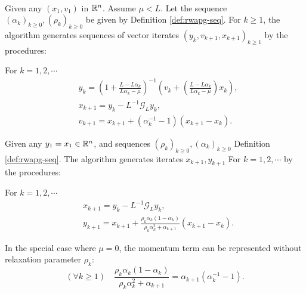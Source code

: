 \documentclass[12pt]{article}
\begin{document}
        \begin{definition}\label{def:r-wapg-st-form} \; \\
            Given any $(x_1, v_1)$ in $\mathbb R^n$. 
            Assume $\mu < L$.
            Let the sequence $(\alpha_k)_{k \ge 0}, (\rho_k)_{k\ge 0}$ be given by Definition \ref{def:rwapg-seq}. 
            For $k \ge 1$, the algorithm generates sequences of vector iterates $(y_k, v_{k + 1}, x_{k + 1})_{k \ge 1}$ by the procedures: 
            \begin{tcolorbox}
                For $k=1, 2, \cdots $
                \begin{align*}
                    & y_k = 
                    \left(
                        1 + \frac{L - L\alpha_k}{L\alpha_k - \mu}
                    \right)^{-1}
                    \left(
                        v_k + 
                        \left(\frac{L - L\alpha_k}{L\alpha_k - \mu} \right) x_k
                    \right), 
                    \\
                    & x_{k + 1} = 
                    y_k - L^{-1} \mathcal G_L y_k, 
                    \\
                    & v_{k + 1} = 
                    x_{k + 1} + (\alpha_k^{-1} -1)(x_{k + 1} - x_k). 
                \end{align*}    
            \end{tcolorbox}
        \end{definition}
        \begin{definition}\label{def:r-wapg-momentum-form}
            Given any $y_1 = x_1 \in \mathbb R^n$, and sequences $(\rho_k)_{k \ge 0}, (\alpha_k)_{k\ge 0}$ Definition \ref{def:rwapg-seq}. 
            The algorithm generates iterates $x_{k + 1}, y_{k + 1}$ For $k = 1, 2, \cdots $ by the procedures: 
            \begin{tcolorbox}
                For $k=1, 2,\cdots $
                \begin{align*}
                    & x_{k + 1} = y_k - L^{-1}\mathcal G_Ly_k, 
                    \\
                    & 
                    y_{k + 1} = 
                    x_{k + 1} + 
                    \frac{\rho_k\alpha_k(1 - \alpha_k)}{\rho_k\alpha_k^2 + \alpha_{k + 1}}(x_{k + 1} - x_k). 
                \end{align*}    
            \end{tcolorbox}
            In the special case where $\mu = 0$, the momentum term can be represented without relaxation parameter $\rho_k$: 
            $$
                (\forall k \ge 1)\quad \frac{\rho_k\alpha_k(1 - \alpha_k)}{\rho_k\alpha_k^2 + \alpha_{k + 1}} 
                = \alpha_{k + 1}(\alpha_k^{-1} - 1).  
            $$
        \end{definition}
\end{document}

